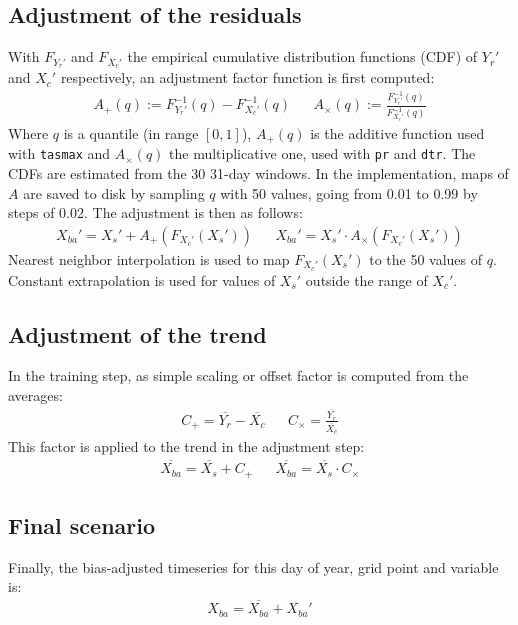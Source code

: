 \documentclass[letterpaper,10pt]{article}
\begin{document}
\subsection{Adjustment of the residuals}
With $F_{Y_r'}$ and $F_{X_c'}$ the empirical cumulative distribution functions (CDF) of $Y_r'$ and $X_c'$ respectively, an adjustment factor function is first computed:
\begin{align}
A_+(q) := F^{-1}_{Y_r'}\left(q\right) - F^{-1}_{X_c'}\left(q\right)  && A_\times(q) := \frac{F^{-1}_{Y_r'}\left(q\right)}{F^{-1}_{X_c'}\left(q\right)}
\end{align}
Where $q$ is a quantile (in range $[0, 1]$), $A_+(q)$ is the additive function used with \texttt{tasmax} and $A_\times(q)$ the multiplicative one, used with \texttt{pr} and \texttt{dtr}.
The CDFs are estimated from the 30 31-day windows.
In the implementation, maps of $A$ are saved to disk by sampling $q$ with 50 values, going from 0.01 to 0.99 by steps of 0.02.
The adjustment is then as follows:
\begin{align}
X_{ba}' = X_s' + A_+\left(F_{X_c'}(X_s')\right) && X_{ba}' = X_s' \cdot A_\times\left(F_{X_c'}(X_s')\right)
\end{align}
Nearest neighbor interpolation is used to map $F_{X_c'}(X_s')$ to the 50 values of $q$.
Constant extrapolation is used for values of $X_s'$ outside the range of $X_c'$.

\subsection{Adjustment of the trend}
In the training step, as simple scaling or offset factor is computed from the averages:
\begin{align}
C_+ = \overline{Y_r} - \overline{X_c} && C_\times = \frac{\overline{Y_r}}{\overline{X_c}}
\end{align}
This factor is applied to the trend in the adjustment step:
\begin{align}
\overline{X_{ba}} = \overline{X_s} + C_+  && \overline{X_{ba}} = \overline{X_s}\cdot C_\times
\end{align}

\subsection{Final scenario}
Finally, the bias-adjusted timeseries for this day of year, grid point and variable is:
\begin{align}
X_{ba} = \overline{X_{ba}} + X_{ba}'
\end{align}
\end{document}
